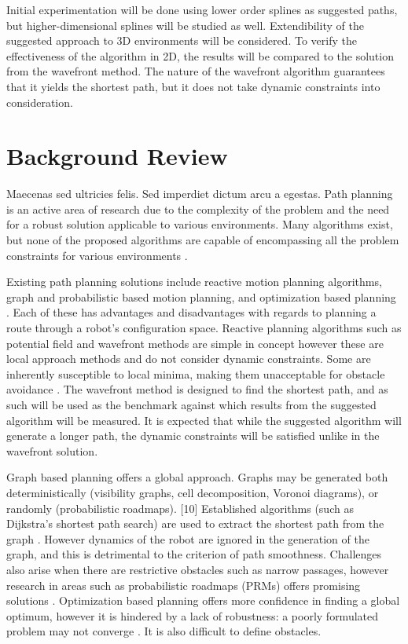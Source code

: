 \documentclass[twoside]{article}
\begin{document}
\begin{multicols}{2}
Initial experimentation will be done using lower order splines as suggested paths, but higher-dimensional splines will be studied as well. Extendibility of the suggested approach to 3D environments will be considered. To verify the effectiveness of the algorithm in 2D, the results will be compared to the solution from the wavefront method. The nature of the wavefront algorithm guarantees that it yields the shortest path, but it does not take dynamic constraints into consideration.


\section{Background Review}

Maecenas sed ultricies felis. Sed imperdiet dictum arcu a egestas. 
Path planning is an active area of research due to the complexity of the problem and the need for a robust solution applicable to various environments. Many algorithms exist, but none of the proposed algorithms are capable of encompassing all the problem constraints for various environments \cite{sariff06}.

Existing path planning solutions include reactive motion planning algorithms, graph and probabilistic based motion planning, and optimization based planning \cite{waslanderI}. Each of these has advantages and disadvantages with regards to planning a route through a robot’s configuration space. Reactive planning algorithms such as potential field and wavefront methods are simple in concept however these are local approach methods and do not consider dynamic constraints. Some are inherently susceptible to local minima, making them unacceptable for obstacle avoidance \cite{koren91}. The wavefront method is designed to find the shortest path, and as such will be used as the benchmark against which results from the suggested algorithm will be measured. It is expected that while the suggested algorithm will generate a longer path, the dynamic constraints will be satisfied unlike in the wavefront solution.

Graph based planning offers a global approach. Graphs may be generated both deterministically (visibility graphs, cell decomposition, Voronoi diagrams), or randomly (probabilistic roadmaps). [10] Established algorithms (such as Dijkstra's shortest path search) are used to extract the shortest path from the graph \cite{dijkstra59}. However dynamics of the robot are ignored in the generation of the graph, and this is detrimental to the criterion of path smoothness. Challenges also arise when there are restrictive obstacles such as narrow passages, however research in areas such as probabilistic roadmaps (PRMs) offers promising solutions \cite{hsu03}. Optimization based planning offers more confidence in finding a global optimum, however it is hindered by a lack of robustness: a poorly formulated problem may not converge \cite{waslanderIII}. It is also difficult to define obstacles.


\end{multicols}
\end{document}

